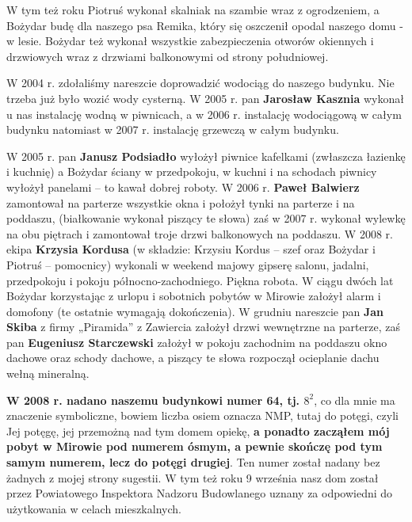 W tym też roku Piotruś wykonał skalniak na szambie wraz z ogrodzeniem, a Bożydar budę dla naszego psa Remika, który się oszczenił opodal naszego domu -  w lesie. Bożydar też wykonał wszystkie zabezpieczenia otworów okiennych i drzwiowych wraz z drzwiami balkonowymi od strony południowej.

W 2004 r. zdołaliśmy nareszcie doprowadzić wodociąg do naszego budynku. Nie trzeba już było wozić wody cysterną. W 2005 r. pan \textbf{Jarosław Kasznia} wykonał u nas instalację wodną w piwnicach, a w 2006 r. instalację wodociągową w całym budynku natomiast w 2007 r. instalację grzewczą w całym budynku.

W 2005 r. pan \textbf{Janusz Podsiadło} wyłożył piwnice kafelkami (zwłaszcza łazienkę i kuchnię) a Bożydar ściany w przedpokoju, w kuchni i na schodach piwnicy wyłożył panelami – to kawał dobrej roboty. W 2006 r. \textbf{Paweł Balwierz} zamontował na parterze wszystkie okna i położył tynki na parterze i na poddaszu, (białkowanie wykonał piszący te słowa) zaś w 2007 r. wykonał wylewkę na obu piętrach i zamontował troje drzwi balkonowych na poddaszu. W 2008 r. ekipa \textbf{Krzysia Kordusa} (w składzie: Krzysiu Kordus – szef oraz Bożydar i Piotruś – pomocnicy) wykonali w weekend majowy gipserę salonu, jadalni, przedpokoju i pokoju północno-zachodniego. Piękna robota. W ciągu dwóch lat Bożydar korzystając z urlopu i sobotnich pobytów w Mirowie założył alarm i domofony (te ostatnie wymagają dokończenia). W grudniu nareszcie pan \textbf{Jan Skiba} z firmy „Piramida” z Zawiercia założył drzwi wewnętrzne na parterze, zaś pan \textbf{Eugeniusz Starczewski} założył w pokoju zachodnim na poddaszu okno dachowe oraz schody dachowe, a piszący te słowa rozpoczął ocieplanie dachu wełną mineralną.

\textbf{W 2008 r. nadano naszemu budynkowi numer 64, tj. $8^{2}$}, co dla mnie ma znaczenie symboliczne, bowiem liczba osiem oznacza NMP, tutaj do potęgi, czyli Jej potęgę, jej przemożną nad tym domem opiekę, \textbf{a ponadto zacząłem mój pobyt w Mirowie pod numerem ósmym, a pewnie skończę pod tym samym numerem, lecz do potęgi drugiej}. Ten numer został nadany bez żadnych z mojej strony sugestii. W tym też roku 9 września nasz dom został przez Powiatowego Inspektora Nadzoru Budowlanego uznany za odpowiedni do użytkowania w celach mieszkalnych.

